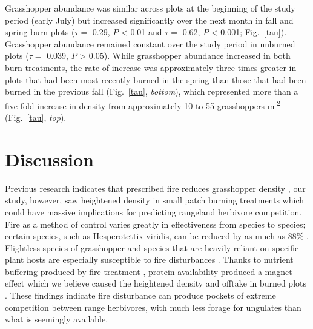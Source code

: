 \documentclass[referee, 
	            sn-basic]
           {sn-jnl}
\begin{document}
\begin{linenumbers}
Grasshopper abundance was similar across plots at the beginning of the study period (early July) but increased significantly over the next month in fall and spring burn plots (\(\tau =\) 0.29, \(P\) \textless{} 0.01 and \(\tau =\) 0.62, \(P\) \textless{} 0.001; Fig.~\ref{tau}). 
Grasshopper abundance remained constant over the study period in unburned plots (\(\tau =\) 0.039, \(P\) \textgreater{} 0.05). 
While grasshopper abundance increased in both burn treatments, the rate of increase was approximately three times greater in plots that had been most recently burned in the spring than those that had been burned in the previous fall (Fig.~\ref{tau}, \emph{bottom}), which represented more than a five-fold increase in density from approximately 10 to 55 grasshoppers m\textsuperscript{-2} (Fig.~\ref{tau}, \emph{top}).

\hypertarget{discussion}{%
\section{Discussion}\label{discussion}}

Previous research indicates that prescribed fire reduces grasshopper
density \citep{joern2004, vermeire2004}, our study, however, saw
heightened density in small patch burning treatments which could have
massive implications for predicting rangeland herbivore competition.
Fire as a method of control varies greatly in effectiveness from species
to species; certain species, such as Hesperotettix viridis, can be
reduced by as much as 88\% \citep{vermeire2004}. Flightless species of
grasshopper and species that are heavily reliant on specific plant hosts
are especially susceptible to fire disturbances \citep{matenaar2014}.
Thanks to nutrient buffering produced by fire treatment
\citep{spiess2020}, protein availability produced a magnet effect which
we believe caused the heightened density and offtake in burned plots
\citep{meyer2002}. These findings indicate fire disturbance can produce
pockets of extreme competition between range herbivores, with much less
forage for ungulates than what is seemingly available.


\end{linenumbers}
\end{document}
